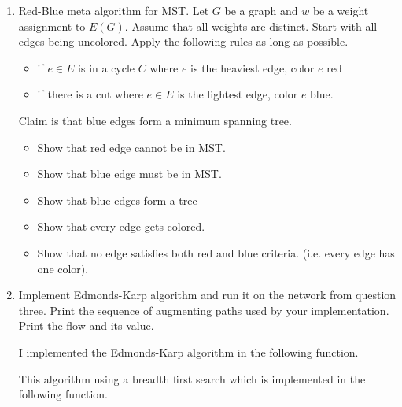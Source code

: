 \documentclass[11pt, oneside]{article}
\begin{document}
\begin{enumerate}
  \item %
    Red-Blue meta algorithm for MST.
    Let $G$ be a graph and $w$ be a weight assignment to $E(G)$.
    Assume that all weights are distinct.
    Start with all edges being uncolored.
    Apply the following rules as long as possible.
    \begin{itemize}
      \item if $e \in E$ is in a cycle $C$ where $e$ is the heaviest edge, color $e$ red
      \item if there is a cut where $e\in E$ is the lightest edge, color $e$ blue.
    \end{itemize}
    Claim is that blue edges form a minimum spanning tree.
    \begin{itemize}
      \item Show that red edge cannot be in MST.
      \item Show that blue edge must be in MST.
      \item Show that blue edges form a tree
      \item Show that every edge gets colored.
      \item Show that no edge satisfies both red and blue criteria. (i.e. every edge has one color).
    \end{itemize}

  \item %
    Implement Edmonds-Karp algorithm and run it on the network from question three.
    Print the sequence of augmenting paths used by your implementation.
    Print the flow and its value.

    I implemented the Edmonds-Karp algorithm in the following function.
    

    This algorithm using a breadth first search which is implemented in the
    following function.
    


\end{enumerate}
\end{document}
